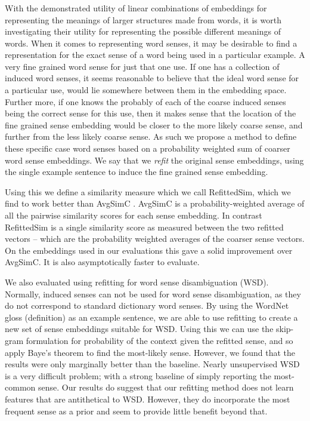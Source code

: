 \documentclass{book}
\begin{document}
\subsubsection{ }
With the demonstrated utility of linear combinations of embeddings for representing the meanings of larger structures made from words,
it is worth investigating their utility for representing the possible different meanings of words.
When it comes to representing word senses, it may be desirable to find a representation for the exact sense of a word being used in a particular example.
A very fine grained word sense for just that one use.
If one has a collection of induced word senses, it seems reasonable to believe that the ideal word sense for a particular use, would lie somewhere between them in the embedding space.
Further more, if one knows the probably of each of the coarse induced senses being the correct sense for this use,
then it makes sense that the location of the fine grained sense embedding would be closer to the more likely coarse sense,
and further from the less likely coarse sense.
As such we propose a method to define these specific case word senses based on a probability weighted sum of coarser word sense embeddings.
We say that we \emph{refit} the original sense embeddings, using the single example sentence to induce the fine grained sense embedding.

Using this we define a similarity measure which we call RefittedSim, which we find to work better than AvgSimC \citep{Reisinger2010}.
AvgSimC is a probability-weighted average of all the pairwise similarity scores for each sense embedding.
In contrast RefittedSim is a single similarity score as measured between the two refitted vectors -- which are the probability weighted averages of the coarser sense vectors.
On the embeddings used in our evaluations this gave a solid improvement over AvgSimC.
It is also asymptotically faster to evaluate.

We also evaluated using refitting for word sense disambiguation (WSD).
Normally, induced senses can not be used for word sense disambiguation, as they do not correspond to standard dictionary word senses.
By using the WordNet gloss (definition) as an example sentence, we are able to use refitting to create a new set of sense embeddings suitable for WSD.
Using this we can use the skip-gram formulation for probability of the context given the  refitted sense, and so apply Baye's theorem to find the most-likely sense.
However, we found that the results were only marginally better than the baseline.
Nearly unsupervised WSD is a very difficult problem; with a strong baseline of simply reporting the most-common sense.
Our results do suggest that our refitting method does not learn features that are antithetical to WSD.
However, they do incorporate the most frequent sense as a prior and seem to provide little benefit beyond that.
\end{document}
